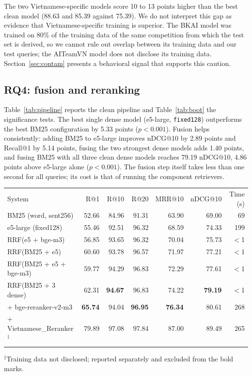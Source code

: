 \documentclass{ws-vjcs}
\begin{document}
The two Vietnamese-specific models score 10 to 13 points higher than the best clean model (88.63 and 85.39 against 75.39). We do not interpret this gap as evidence that Vietnamese-specific training is superior. The BKAI model was trained on 80\% of the training data of the same competition from which the test set is derived, so we cannot rule out overlap between its training data and our test queries; the AITeamVN model does not disclose its training data. Section~\ref{sec:contam} presents a behavioral signal that supports this caution.

\subsection{RQ4: fusion and reranking}

Table~\ref{tab:pipeline} reports the clean pipeline and Table~\ref{tab:boot} the significance tests. The best single dense model (e5-large, \texttt{fixed128}) outperforms the best BM25 configuration by 5.33 points ($p < 0.001$). Fusion helps consistently: adding BM25 to e5-large improves nDCG@10 by 2.89 points and Recall@1 by 5.14 points, fusing the two strongest dense models adds 1.40 points, and fusing BM25 with all three clean dense models reaches 79.19 nDCG@10, 4.86 points above e5-large alone ($p < 0.001$). The fusion step itself takes less than one second for all queries; its cost is that of running the component retrievers.

\begin{table}[t]
{\begin{tabular}{@{}lrrrrrr@{}} \toprule
System & R@1 & R@10 & R@20 & MRR@10 & nDCG@10 & Time (s) \\ \colrule
BM25 (word, sent256) & 52.66 & 84.96 & 91.31 & 63.90 & 69.00 & 69 \\
e5-large (fixed128) & 55.46 & 92.51 & 96.32 & 68.59 & 74.33 & 199 \\
RRF(e5 + bge-m3) & 56.85 & 93.65 & 96.32 & 70.04 & 75.73 & $<$1 \\
RRF(BM25 + e5) & 60.60 & 93.78 & 96.57 & 71.97 & 77.21 & $<$1 \\
RRF(BM25 + e5 + bge-m3) & 59.77 & 94.29 & 96.83 & 72.29 & 77.61 & $<$1 \\
RRF(BM25 + 3 dense) & 62.31 & \textbf{94.67} & 96.83 & 74.22 & \textbf{79.19} & $<$1 \\
\quad + bge-reranker-v2-m3 & \textbf{65.74} & 94.04 & \textbf{96.95} & \textbf{76.34} & 80.61 & 268 \\ \colrule
\quad + Vietnamese\_Reranker$^\ddagger$ & 79.89 & 97.08 & 97.84 & 87.00 & 89.49 & 265 \\ \botrule
\end{tabular}}
\begin{tabnote}
$^\ddagger$Training data not disclosed; reported separately and excluded from the bold marks.
\end{tabnote}
\end{table}
\end{document}
